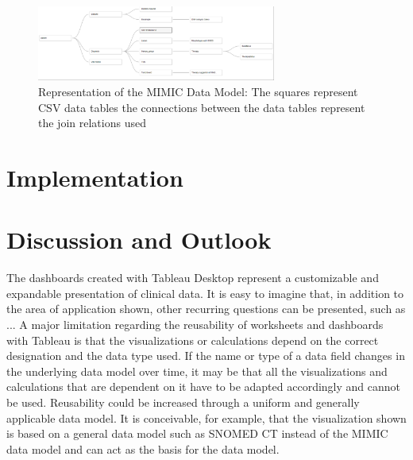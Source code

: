 \documentclass[aac,crcready]{iosart2x}
\begin{document}
\begin{figure}[t]
\includegraphics[width=0.7\textwidth]{images/datamodel_1.png}
\caption{Representation of the MIMIC Data Model: The squares represent CSV data tables the connections between the data tables represent the join relations used}\label{f1}
\end{figure}

\section{Implementation}\label{s4}



\section{Discussion and Outlook}\label{s5}
The dashboards created with Tableau Desktop represent a customizable and expandable presentation of clinical data. It is easy to imagine that, in addition to the area of application shown, other recurring questions can be presented, such as ...
A major limitation regarding the reusability of worksheets and dashboards with Tableau is that the visualizations or calculations depend on the correct designation and the data type used. If the name or type of a data field changes in the underlying data model over time, it may be that all the visualizations and calculations that are dependent on it have to be adapted accordingly and cannot be used. Reusability could be increased through a uniform and generally applicable data model. It is conceivable, for example, that the visualization shown is based on a general data model such as SNOMED CT instead of the MIMIC data model and can act as the basis for the data model.

\end{document}
